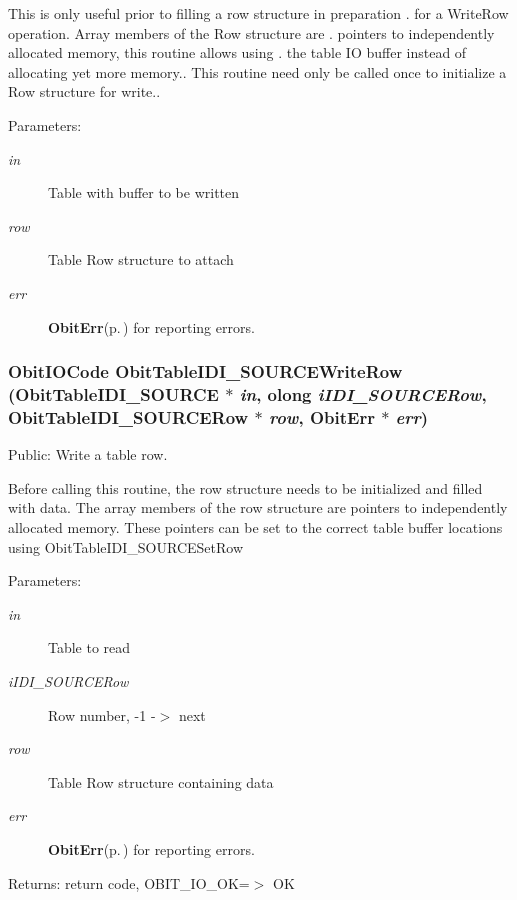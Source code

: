 This is only useful prior to filling a row structure in preparation . for a Write\-Row operation. Array members of the Row structure are . pointers to independently allocated memory, this routine allows using . the table IO buffer instead of allocating yet more memory.. This routine need only be called once to initialize a Row structure for write.. \begin{Desc}
\item[Parameters:]
\begin{description}
\item[{\em in}]Table with buffer to be written \item[{\em row}]Table Row structure to attach \item[{\em err}]{\bf Obit\-Err}{\rm (p.\,\pageref{structObitErr})} for reporting errors. \end{description}
\end{Desc}
\subsubsection{\setlength{\rightskip}{0pt plus 5cm}Obit\-IOCode Obit\-Table\-IDI\_\-SOURCEWrite\-Row ({\bf Obit\-Table\-IDI\_\-SOURCE} $\ast$ {\em in}, {\bf olong} {\em i\-IDI\_\-SOURCERow}, {\bf Obit\-Table\-IDI\_\-SOURCERow} $\ast$ {\em row}, {\bf Obit\-Err} $\ast$ {\em err})}\label{ObitTableIDI__SOURCE_8c_a24}


Public: Write a table row. 

Before calling this routine, the row structure needs to be initialized and filled with data. The array members of the row structure are pointers to independently allocated memory. These pointers can be set to the correct table buffer locations using Obit\-Table\-IDI\_\-SOURCESet\-Row \begin{Desc}
\item[Parameters:]
\begin{description}
\item[{\em in}]Table to read \item[{\em i\-IDI\_\-SOURCERow}]Row number, -1 -$>$ next \item[{\em row}]Table Row structure containing data \item[{\em err}]{\bf Obit\-Err}{\rm (p.\,\pageref{structObitErr})} for reporting errors. \end{description}
\end{Desc}
\begin{Desc}
\item[Returns:]return code, OBIT\_\-IO\_\-OK=$>$ OK \end{Desc}
